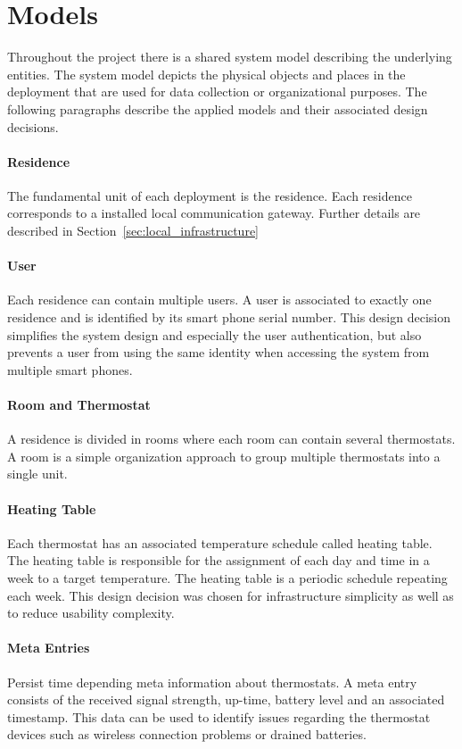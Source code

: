 \section{Models}
\label{sec:system_overview_models}

Throughout the project there is a shared system model describing the underlying entities. The system model depicts the physical objects and places in the deployment that are used for data collection or organizational purposes. The following paragraphs describe the applied models and their associated design decisions.

\paragraph{Residence}

The fundamental unit of each deployment is the residence. Each residence corresponds to a installed local communication gateway. Further details are described in Section~\ref{sec:local_infrastructure}

\paragraph{User}

Each residence can contain multiple users. A user is associated to exactly one residence and is identified by its smart phone serial number. This design decision simplifies the system design and especially the user authentication, but also prevents a user from using the same identity when accessing the system from multiple smart phones.

\paragraph{Room and Thermostat}
A residence is divided in rooms where each room can contain several thermostats. A room is a simple organization approach to group multiple thermostats into a single unit.

\paragraph{Heating Table}

Each thermostat has an associated temperature schedule called heating table. The heating table is responsible for the assignment of each day and time in a week to a target temperature. The heating table is a periodic schedule repeating each week. This design decision was chosen for infrastructure simplicity as well as to reduce usability complexity.

\paragraph{Meta Entries}

Persist time depending meta information about thermostats. A meta entry consists of the received signal strength, up-time, battery level and an associated timestamp. This data can be used to identify issues regarding the thermostat devices such as wireless connection problems or drained batteries.